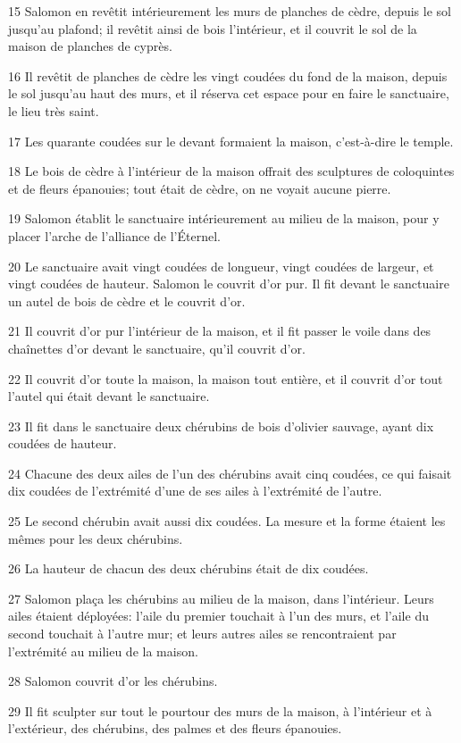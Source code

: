 \par 15 Salomon en revêtit intérieurement les murs de planches de cèdre, depuis le sol jusqu'au plafond; il revêtit ainsi de bois l'intérieur, et il couvrit le sol de la maison de planches de cyprès.
\par 16 Il revêtit de planches de cèdre les vingt coudées du fond de la maison, depuis le sol jusqu'au haut des murs, et il réserva cet espace pour en faire le sanctuaire, le lieu très saint.
\par 17 Les quarante coudées sur le devant formaient la maison, c'est-à-dire le temple.
\par 18 Le bois de cèdre à l'intérieur de la maison offrait des sculptures de coloquintes et de fleurs épanouies; tout était de cèdre, on ne voyait aucune pierre.
\par 19 Salomon établit le sanctuaire intérieurement au milieu de la maison, pour y placer l'arche de l'alliance de l'Éternel.
\par 20 Le sanctuaire avait vingt coudées de longueur, vingt coudées de largeur, et vingt coudées de hauteur. Salomon le couvrit d'or pur. Il fit devant le sanctuaire un autel de bois de cèdre et le couvrit d'or.
\par 21 Il couvrit d'or pur l'intérieur de la maison, et il fit passer le voile dans des chaînettes d'or devant le sanctuaire, qu'il couvrit d'or.
\par 22 Il couvrit d'or toute la maison, la maison tout entière, et il couvrit d'or tout l'autel qui était devant le sanctuaire.
\par 23 Il fit dans le sanctuaire deux chérubins de bois d'olivier sauvage, ayant dix coudées de hauteur.
\par 24 Chacune des deux ailes de l'un des chérubins avait cinq coudées, ce qui faisait dix coudées de l'extrémité d'une de ses ailes à l'extrémité de l'autre.
\par 25 Le second chérubin avait aussi dix coudées. La mesure et la forme étaient les mêmes pour les deux chérubins.
\par 26 La hauteur de chacun des deux chérubins était de dix coudées.
\par 27 Salomon plaça les chérubins au milieu de la maison, dans l'intérieur. Leurs ailes étaient déployées: l'aile du premier touchait à l'un des murs, et l'aile du second touchait à l'autre mur; et leurs autres ailes se rencontraient par l'extrémité au milieu de la maison.
\par 28 Salomon couvrit d'or les chérubins.
\par 29 Il fit sculpter sur tout le pourtour des murs de la maison, à l'intérieur et à l'extérieur, des chérubins, des palmes et des fleurs épanouies.
